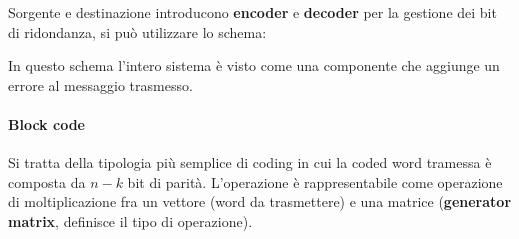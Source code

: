 Sorgente e destinazione introducono \textbf{encoder} e \textbf{decoder} per la gestione dei bit di ridondanza, si può utilizzare lo schema:


\begin{center}
\end{center}


\begin{center}

\end{center}

In questo schema l'intero sistema è visto come una componente che aggiunge un errore al messaggio trasmesso.

\paragraph*{Block code}
Si tratta della tipologia più semplice di coding in cui la coded word tramessa è composta da $n-k$ bit di parità.
L'operazione è rappresentabile come operazione di moltiplicazione fra un vettore (word da trasmettere) e una matrice (\textbf{generator matrix}, definisce il tipo di operazione).

